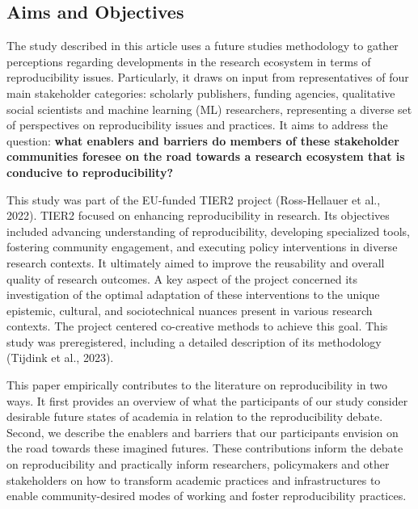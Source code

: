 \documentclass[authordate, meta]{jote-new-article}
\begin{document}
	\subsection{Aims and Objectives}



	The study described in this article uses a future studies methodology to gather perceptions regarding developments in the research ecosystem in terms of reproducibility issues. Particularly, it draws on input from representatives of four main stakeholder categories: scholarly publishers, funding agencies, qualitative social scientists and machine learning (ML) researchers, representing a diverse set of perspectives on reproducibility issues and practices. It aims to address the question: \textbf{what enablers and barriers do members of these stakeholder communities foresee on the road towards a research ecosystem that is conducive to reproducibility?}



	This study was part of the EU-funded TIER2 project (Ross-Hellauer et al., 2022). TIER2 focused on enhancing reproducibility in research. Its objectives included advancing understanding of reproducibility, developing specialized tools, fostering community engagement, and executing policy interventions in diverse research contexts. It ultimately aimed to improve the reusability and overall quality of research outcomes. A key aspect of the project concerned its investigation of the optimal adaptation of these interventions to the unique epistemic, cultural, and sociotechnical nuances present in various research contexts. The project centered co-creative methods to achieve this goal. This study was preregistered, including a detailed description of its methodology (Tijdink et al., 2023).



	This paper empirically contributes to the literature on reproducibility in two ways. It first provides an overview of what the participants of our study consider desirable future states of academia in relation to the reproducibility debate. Second, we describe the enablers and barriers that our participants envision on the road towards these imagined futures. These contributions inform the debate on reproducibility and practically inform researchers, policymakers and other stakeholders on how to transform academic practices and infrastructures to enable community-desired modes of working and foster reproducibility practices.
\end{document}

